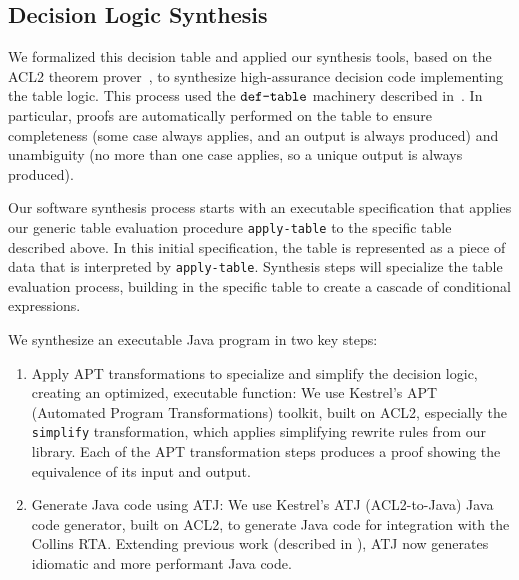 \subsection{Decision Logic Synthesis}



We formalized this decision table and applied our synthesis tools, based on the
ACL2 theorem prover~\cite{acl2}, to synthesize high-assurance decision code
implementing the table logic.  This process used the $\verb+def-table+$
machinery described in~\cite{dasc2020}.  In particular, proofs are
automatically performed on the table to ensure completeness (some case always
applies, and an output is always produced) and unambiguity (no more than one
case applies, so a unique output is always produced).

Our software synthesis process starts with an executable specification that applies our generic table evaluation procedure \texttt{apply-table} to the specific table described above.  In this initial specification, the table is represented as a piece of data that is interpreted by \texttt{apply-table}.  Synthesis steps will specialize the table evaluation process, building in the specific table to create a cascade of conditional expressions.

We synthesize an executable Java program in two key steps:
\begin{enumerate}

\item Apply APT transformations to specialize and simplify the
  decision logic, creating an optimized, executable function: We use Kestrel's
  APT (Automated Program Transformations) \cite{apt} toolkit, built on ACL2,
  especially the \texttt{simplify} transformation, which applies simplifying
  rewrite rules from our library.
  Each of the APT transformation steps produces a proof showing the equivalence
  of its input and output.

\item Generate Java code using ATJ\cite{atj}: We use Kestrel's ATJ (ACL2-to-Java) Java
  code generator, built on ACL2, to generate Java code for integration with the
  Collins RTA.  Extending previous work (described in \cite{dasc2020}), ATJ now
  generates idiomatic and more performant Java code.

\end{enumerate}

